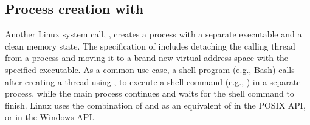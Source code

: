\begin{comment}
\vspace{5pt}
\noindent{\bf Discussion.~}
A Graphene picoprocess can copy part or all its address space into a child
picoprocess relatively efficiently.
Although this mechanism is less efficient than an in-kernel {\tt fork},
we wanted to maintain the generality benefits of recent \liboses{},
and only added the minimal building blocks to the host ABI.
The transfer of data is explicit to the host, can be mediated by a reference monitor,
the sender, or the receiver.
For instance, recent Unix systems introduced a close-on-exec flag for file handles~\citep{close-on-exec}, 
which prevents inheritance of handles to sensitive files.  This can be implemented
either in a parent, by excluding the file handle from a checkpoint, 
or in the child, by closing this handle on an {\tt exec} call.
Our current implementation implements close-on-exec in the child for complete compatibility,
but a more security-sensitive application could easily implement ``close-on-fork'' semantics 
in the parent.
This clean division of labor retains full functionality
and facilitates extensibility.


\end{comment}



\subsection{Process creation with }


Another Linux system call, , creates a process with a separate executable and a clean memory state.
The specification of 
includes detaching the calling thread from a process and moving it to a brand-new virtual address space with the specified executable.
As a common use case, a shell program (e.g., Bash) calls  after creating a thread using ,
to execute a shell command (e.g., ) in a separate process, while the main process continues and waits for the shell command to finish.
Linux uses the combination of  and 
as an equivalent of  in the POSIX API, or  in the Windows API.


